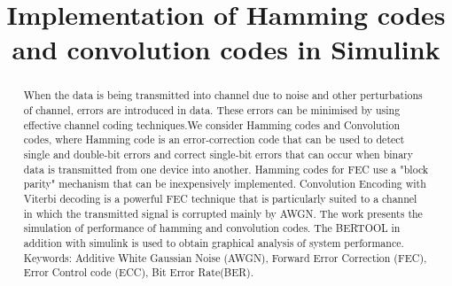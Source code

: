 \documentclass[conference]{IEEEtran}
\begin{document}
\title{Implementation of Hamming codes and convolution codes in Simulink}
\author
{
\and


\and
{}
\and
{}
}


\maketitle
\begin{abstract}
When the data is being transmitted into channel due to noise and other perturbations of channel, errors are introduced in data. These errors can be minimised by using effective channel coding techniques.We consider Hamming codes and Convolution codes, where Hamming code is an error-correction code that can be used to detect single and double-bit errors and correct single-bit errors that can occur when binary data is transmitted from one device into another. Hamming codes for FEC use a "block parity" mechanism that can be inexpensively implemented. Convolution Encoding with Viterbi decoding is a powerful FEC technique that is particularly suited to a channel in which the transmitted signal is corrupted mainly by AWGN. The work presents the simulation of performance of hamming and convolution codes. The BERTOOL in addition with simulink is used to obtain graphical analysis of system performance.
\\Keywords: Additive White Gaussian Noise (AWGN), Forward Error Correction (FEC), Error Control code (ECC), Bit Error Rate(BER).
\end{abstract}
\end{document}
